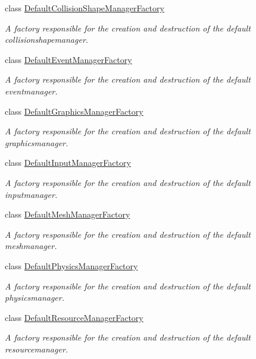 \begin{DoxyCompactItemize}
class \hyperlink{classMezzanine_1_1DefaultCollisionShapeManagerFactory}{Default\-Collision\-Shape\-Manager\-Factory}
\begin{DoxyCompactList}\small\item\em A factory responsible for the creation and destruction of the default collisionshapemanager. \end{DoxyCompactList}\item 
class \hyperlink{classMezzanine_1_1DefaultEventManagerFactory}{Default\-Event\-Manager\-Factory}
\begin{DoxyCompactList}\small\item\em A factory responsible for the creation and destruction of the default eventmanager. \end{DoxyCompactList}\item 
class \hyperlink{classMezzanine_1_1DefaultGraphicsManagerFactory}{Default\-Graphics\-Manager\-Factory}
\begin{DoxyCompactList}\small\item\em A factory responsible for the creation and destruction of the default graphicsmanager. \end{DoxyCompactList}\item 
class \hyperlink{classMezzanine_1_1DefaultInputManagerFactory}{Default\-Input\-Manager\-Factory}
\begin{DoxyCompactList}\small\item\em A factory responsible for the creation and destruction of the default inputmanager. \end{DoxyCompactList}\item 
class \hyperlink{classMezzanine_1_1DefaultMeshManagerFactory}{Default\-Mesh\-Manager\-Factory}
\begin{DoxyCompactList}\small\item\em A factory responsible for the creation and destruction of the default meshmanager. \end{DoxyCompactList}\item 
class \hyperlink{classMezzanine_1_1DefaultPhysicsManagerFactory}{Default\-Physics\-Manager\-Factory}
\begin{DoxyCompactList}\small\item\em A factory responsible for the creation and destruction of the default physicsmanager. \end{DoxyCompactList}\item 
class \hyperlink{classMezzanine_1_1DefaultResourceManagerFactory}{Default\-Resource\-Manager\-Factory}
\begin{DoxyCompactList}\small\item\em A factory responsible for the creation and destruction of the default resourcemanager. \end{DoxyCompactList}\item 

\end{DoxyCompactItemize}
